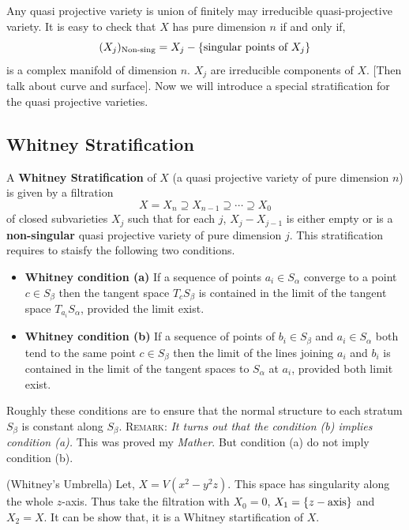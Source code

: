 \documentclass[11pt]{article}
\begin{document}
\noindent Any quasi projective variety is union of finitely may irreducible quasi-projective variety. It is easy to check that $X$ has pure dimension $n$ if and only if,$$(X_j)_{\text{Non-sing}} = X_j-\qty{\text{singular points of }X_j}$$ 
 is a complex manifold of dimension $n$. $X_j$ are irreducible components of $X$. [Then talk about curve and surface]. Now we will introduce a special stratification for the quasi projective varieties. 

 \subsection{Whitney Stratification}

 A \textbf{Whitney Stratification} of $X$ (a quasi projective variety of pure dimension $n$) is given by a filtration $$X=X_n\supseteq X_{n-1}\supseteq \cdots \supseteq X_0$$ of closed subvarieties $X_j$ such that for each $j$, $X_j-X_{j-1}$ is either empty or is a \textbf{non-singular} quasi projective variety of pure dimension $j$. This stratification requires to staisfy the following two conditions. 
 \begin{itemize}
    \item \textbf{Whitney condition (a)} If a sequence of points $a_i\in S_{\alpha}$ converge to a point $c \in S_{\beta}$ then the tangent space $T_cS_{\beta}$ is contained in the limit of the tangent space $T_{a_i}S_{\alpha}$, provided the limit exist.
    \item \textbf{Whitney condition (b)} If a sequence of points of $b_i \in S_{\beta}$ and $a_i \in S_{\alpha}$ both tend to the same point $c \in S_{\beta}$ then the limit of the lines joining $a_i$ and $b_i$ is contained in the limit of the tangent spaces to $S_{\alpha}$ at $a_i$, provided both limit exist.
 \end{itemize} 
Roughly these conditions are to ensure that the normal structure to each stratum $S_{\beta}$ is constant along $S_{\beta}$. \textsc{Remark:} \textit{It turns out that the condition (b) implies condition (a).} This was proved my \textit{Mather}. But condition (a) do not imply condition (b). 

\vspace*{0.2cm}

\noindent {}  (Whitney's Umbrella) Let, $X = V(x^2-y^2z)$. This space has singularity along the whole $z$-axis. Thus take the filtration with $X_0 = \qty{0}$, $X_1 = \qty{z-\text{axis}}$ and $X_2 = X$. It can be show that, it is a Whitney startification of $X$.
\end{document}
